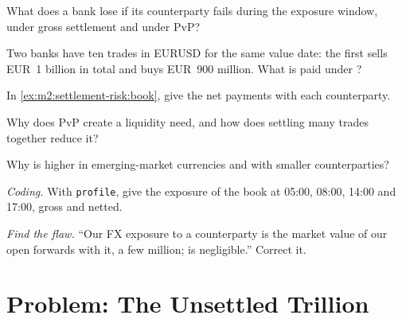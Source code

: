\begin{exercise}[$\star$]\label{exo:m2:settlement-risk:2}
What does a bank lose if its counterparty fails during the exposure window, under
gross settlement and under PvP?
\end{exercise}

\begin{exercise}[$\star$]\label{exo:m2:settlement-risk:3}
Two banks have ten trades in EURUSD for the same value date: the first sells EUR~1
billion in total and buys EUR~900 million. What is paid under ?
\end{exercise}

\begin{exercise}[$\star\star$]\label{exo:m2:settlement-risk:4}
In \cref{ex:m2:settlement-risk:book}, give the net payments with each counterparty.
\end{exercise}

\begin{exercise}[$\star\star$]\label{exo:m2:settlement-risk:5}
Why does PvP create a liquidity need, and how does settling many trades together
reduce it?
\end{exercise}

\begin{exercise}[$\star\star$]\label{exo:m2:settlement-risk:6}
Why is  higher in emerging-market currencies and with smaller
counterparties?
\end{exercise}

\begin{exercise}[$\star\star\star$]\label{exo:m2:settlement-risk:7}
\emph{Coding.} With \texttt{profile}, give the exposure of the book at 05:00,
08:00, 14:00 and 17:00, gross and netted.
\end{exercise}

\begin{exercise}[$\star\star\star$]\label{exo:m2:settlement-risk:8}
\emph{Find the flaw.} ``Our FX exposure to a counterparty is the market value of our
open forwards with it, a few million;  is negligible.'' Correct it.
\end{exercise}

\section{Problem: The Unsettled Trillion}

